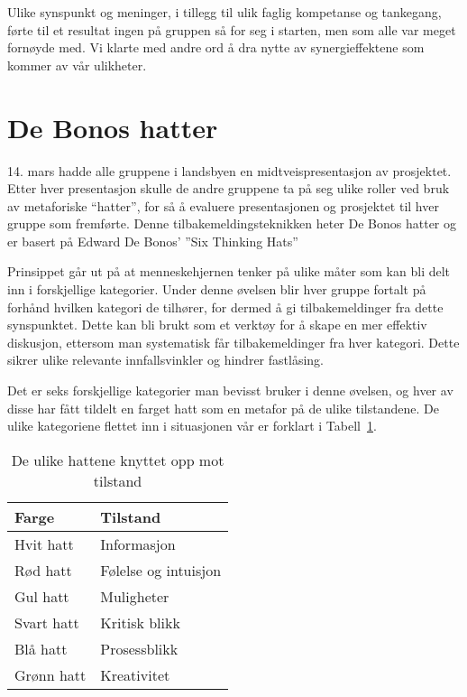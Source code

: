 Ulike synspunkt og meninger, i tillegg til ulik faglig kompetanse og tankegang, førte til et resultat ingen på gruppen så for seg i starten, men som alle var meget fornøyde med. Vi klarte med andre ord å dra nytte av synergieffektene som kommer av vår ulikheter.



\section{De Bonos hatter} %
14. mars hadde alle gruppene i landsbyen en midtveispresentasjon av
prosjektet. Etter hver presentasjon skulle de andre gruppene ta på seg
ulike roller ved bruk av metaforiske “hatter”, for så å evaluere
presentasjonen og prosjektet til hver gruppe som fremførte. Denne
tilbakemeldingsteknikken heter De Bonos hatter og er basert på Edward De
Bonos' ''Six Thinking Hats'' \cite{bonos}

Prinsippet går ut på at menneskehjernen tenker på ulike måter som kan
bli delt inn i forskjellige kategorier. Under denne øvelsen blir hver
gruppe fortalt på forhånd hvilken kategori de tilhører, for dermed å gi
tilbakemeldinger fra dette synspunktet. Dette kan bli brukt som et verktøy
for å skape en mer effektiv diskusjon, ettersom man systematisk får
tilbakemeldinger fra hver kategori. Dette sikrer ulike relevante
innfallsvinkler og hindrer fastlåsing.

Det er seks forskjellige kategorier man bevisst bruker i denne øvelsen,
og hver av disse har fått tildelt en farget hatt som en metafor på de
ulike tilstandene. De ulike kategoriene flettet inn i situasjonen vår er
forklart i Tabell~\ref{tab:hats}.
\\
\begin{table} [H]
\centering
\begin{tabular}{| l | l |}
\hline
\bf{Farge} & \bf{Tilstand} \\
\hline
Hvit hatt & Informasjon \\
Rød hatt & Følelse og intuisjon \\
Gul hatt & Muligheter \\
Svart hatt & Kritisk blikk \\
Blå hatt & Prosessblikk \\
Grønn hatt & Kreativitet \\
\hline
\end{tabular}
\caption{De ulike hattene knyttet opp mot tilstand}
\label{tab:hats}
\end{table}

